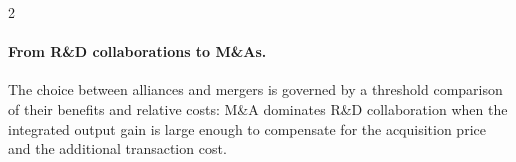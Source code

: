 \documentclass[12pt]{article}
\newtheorem{proposition}[claim]{Proposition}
\begin{document}
\begin{spacing}{2}
\paragraph{From R\&D collaborations to M\&As.} The choice between alliances and mergers is governed by a threshold comparison of their benefits and relative costs: M\&A dominates R\&D collaboration when the integrated output gain is large enough to compensate for the acquisition price and the additional transaction cost.


\end{spacing}
\end{document}
